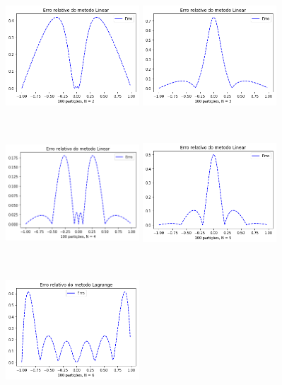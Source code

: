 \documentclass{article}
\begin{document}
\begin{figure}[!htb]
\centering
\includegraphics [width=5cm,height=5cm]{ELa2.png}
\includegraphics [width=5cm,height=5cm]{ELa3.png}
\includegraphics [width=5cm,height=5cm]{ELa4.png}
\includegraphics [width=5cm,height=5cm]{ELa5.png}
\includegraphics [width=5cm,height=5cm]{ELa6.png}

\end{figure}
\end{document}
